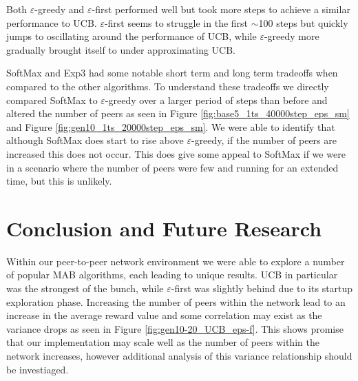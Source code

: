 \documentclass{article}
\begin{document}
Both $\varepsilon$-greedy and $\varepsilon$-first performed well but took more steps to achieve a similar performance to UCB. $\varepsilon$-first seems to struggle in the 
first $\sim$100 steps but quickly jumps to oscillating around the performance of UCB, while $\varepsilon$-greedy more gradually brought itself to under approximating UCB. 

SoftMax and Exp3 had some notable short term and long term tradeoffs when compared to the other algorithms. To understand these tradeoffs we directly compared SoftMax to 
$\varepsilon$-greedy over a larger period of steps than before and altered the number of peers as seen in Figure \ref{fig:base5_1ts_40000step_eps_sm} and 
Figure \ref{fig:gen10_1ts_20000step_eps_sm}. We were able to identify that although SoftMax does start to rise above $\varepsilon$-greedy, if the number of peers are 
increased this does not occur. This does give some appeal to SoftMax if we were in a scenario where the number of peers were few and running for an extended time, but this 
is unlikely. 

\section{Conclusion and Future Research}


Within our peer-to-peer network environment we were able to explore a number of popular MAB algorithms, each leading to unique results. UCB in particular was the strongest 
of the bunch, while $\varepsilon$-first was slightly behind due to its startup exploration phase. %
Increasing the number of peers within the network lead to an increase in the average reward value and some correlation may exist as the variance drops as seen in 
Figure \ref{fig:gen10-20_UCB_eps-f}. This shows promise that our implementation may scale well as the number of peers within the network increases, however additional 
analysis of this variance relationship should be investiaged. 

\end{document}
